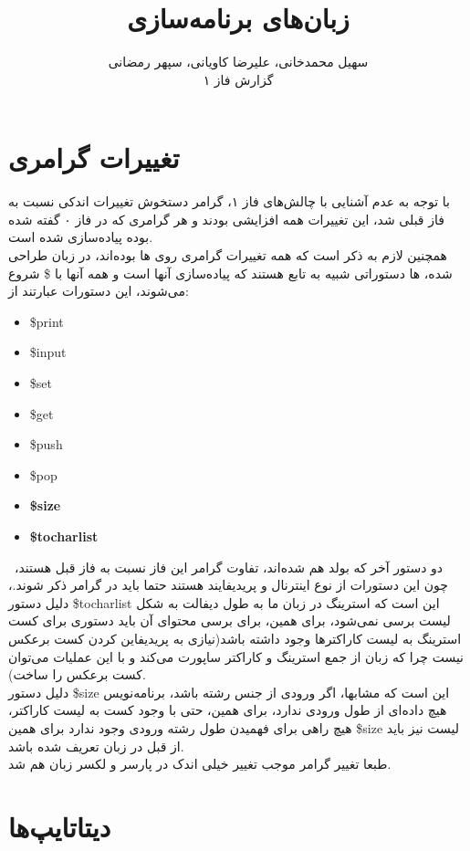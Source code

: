 \documentclass{article}
\title{زبان‌های برنامه‌سازی}
\author{سهیل محمدخانی، علیرضا کاویانی، سپهر رمضانی
\\
گزارش فاز ۱}
\date{} %
\begin{document}
\maketitle

\tableofcontents
\newpage %

\section{تغییرات گرامری}
با توجه به عدم آشنایی با چالش‌های فاز ۱، گرامر دستخوش تغییرات اندکی نسبت به فاز قبلی شد، این تغییرات همه افزایشی بودند 
و هر گرامری که در فاز ۰ گفته شده بوده پیاده‌سازی شده است.\\
همچنین لازم به ذکر است که همه تغییرات گرامری روی 
ها بوده‌اند، در زبان طراحی شده، 
ها دستوراتی شبیه به تابع هستند که پیاده‌سازی آنها 
است و همه آنها با 
\$
شروع می‌شوند، این دستورات عبارتند از:
\begin{itemize}
        \item \$print
        \item \$input
        \item \$set 
        \item \$get 
        \item \$push
        \item \$pop
        \item \textbf{\$size} 
        \item \textbf{\$tocharlist}
\end{itemize}
\
دو دستور آخر که بولد هم شده‌اند، تفاوت گرامر این فاز نسبت به فاز قبل هستند، 
چون این دستورات از نوع اینترنال و پریدیفایند هستند حتما باید در گرامر ذکر شوند.، 
دلیل دستور 
\$tocharlist
این است که استرینگ در زبان ما به طول دیفالت به شکل لیست برسی نمی‌شود، برای همین، برای برسی محتوای آن باید دستوری 
برای کست استرینگ به لیست کاراکترها وجود داشته باشد(نیازی به پریدیفاین کردن کست برعکس نیست چرا که زبان از جمع استرینگ و کاراکتر ساپورت می‌کند و با این عملیات می‌توان کست برعکس را ساخت).
\\
دلیل دستور
\$size
این است که مشابها، اگر ورودی از جنس رشته باشد، برنامه‌نویس هیچ داده‌ای از طول ورودی ندارد،‌ برای همین، حتی با وجود کست به لیست کاراکتر، 
هیچ راهی برای فهمیدن طول رشته ورودی وجود ندارد برای همین \$size لیست نیز باید از قبل در زبان تعریف شده باشد.
\\
طبعا تغییر گرامر موجب تغییر خیلی اندک در پارسر و لکسر زبان هم شد.
\pagebreak
\section{دیتا‌تایپ‌ها}
\end{document}

